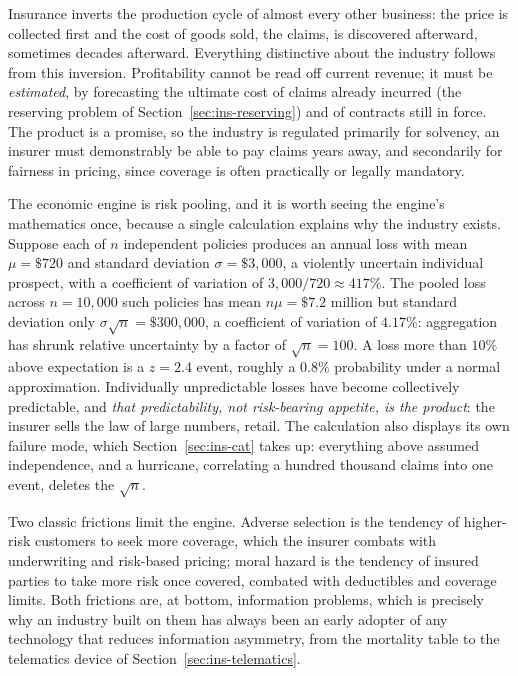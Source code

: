\documentclass[../ai_in_finance]{subfiles}
\begin{document}
Insurance inverts the production cycle of almost every other business: the price is collected first and the cost of goods sold, the claims, is discovered afterward, sometimes decades afterward. Everything distinctive about the industry follows from this inversion. Profitability cannot be read off current revenue; it must be \emph{estimated}, by forecasting the ultimate cost of claims already incurred (the reserving problem of Section~\ref{sec:ins-reserving}) and of contracts still in force. The product is a promise, so the industry is regulated primarily for solvency, an insurer must demonstrably be able to pay claims years away, and secondarily for fairness in pricing, since coverage is often practically or legally mandatory.

The economic engine is risk pooling, and it is worth seeing the engine's mathematics once, because a single calculation explains why the industry exists. Suppose each of $n$ independent policies produces an annual loss with mean $\mu = \$720$ and standard deviation $\sigma = \$3{,}000$, a violently uncertain individual prospect, with a coefficient of variation of $3{,}000/720 \approx 417\%$. The pooled loss across $n = 10{,}000$ such policies has mean $n\mu = \$7.2$ million but standard deviation only $\sigma\sqrt{n} = \$300{,}000$, a coefficient of variation of $4.17\%$: aggregation has shrunk relative uncertainty by a factor of $\sqrt{n} = 100$. A loss more than $10\%$ above expectation is a $z = 2.4$ event, roughly a $0.8\%$ probability under a normal approximation. Individually unpredictable losses have become collectively predictable, and \emph{that predictability, not risk-bearing appetite, is the product}: the insurer sells the law of large numbers, retail. The calculation also displays its own failure mode, which Section~\ref{sec:ins-cat} takes up: everything above assumed independence, and a hurricane, correlating a hundred thousand claims into one event, deletes the $\sqrt{n}$.

Two classic frictions limit the engine. Adverse selection is the tendency of higher-risk customers to seek more coverage, which the insurer combats with underwriting and risk-based pricing; moral hazard is the tendency of insured parties to take more risk once covered, combated with deductibles and coverage limits. Both frictions are, at bottom, information problems, which is precisely why an industry built on them has always been an early adopter of any technology that reduces information asymmetry, from the mortality table to the telematics device of Section~\ref{sec:ins-telematics}.
\end{document}
